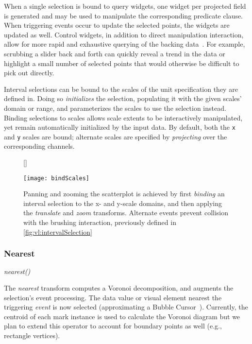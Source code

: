 When a single selection is bound to query widgets, one widget per projected
field is generated and may be used to manipulate the corresponding predicate
clause. When triggering events occur to update the selected points, the widgets
are updated as well. Control widgets, in addition to direct manipulation
interaction, allow for more rapid and exhaustive querying of the backing
data~\cite{shneiderman:dynamicqueries}. For example, scrubbing a slider back and
forth can quickly reveal a trend in the data or highlight a small number of
selected points that would otherwise be difficult to pick out directly.

Interval selections can be bound to the scales of the unit specification they
are defined in. Doing so \emph{initializes} the selection, populating it with
the given scales' domain or range, and parameterizes the scales to use the
selection instead. Binding selections to scales allows scale extents to be
interactively manipulated, yet remain automatically initialized by the input
data. By default, both the \texttt{x} and \texttt{y} scales are bound; alternate
scales are specified by \emph{projecting} over the corresponding channels.

\begin{figure}[h!]
[\FBwidth]
{\caption{Panning and zooming the scatterplot is achieved by first
\emph{binding} an interval selection to the x- and y-scale domains, and then
applying the \emph{translate} and \emph{zoom} transforms. Alternate events
prevent collision with the brushing interaction, previously defined in
\cref{fig:vl:intervalSelection}}\label{fig:vl:bindScales}}
{\texttt{[image: bindScales]}}
\end{figure}

\subsubsection{Nearest}

\centerline{\emph{nearest()}}

The \emph{nearest} transform computes a Voronoi decomposition, and augments the
selection's event processing. The data value or visual element nearest the
triggering \emph{event} is now selected (approximating a Bubble
Cursor~\cite{grossman:bubble}). Currently, the centroid of each mark instance is
used to calculate the Voronoi diagram but we plan to extend this operator to
account for boundary points as well (e.g., rectangle vertices).

